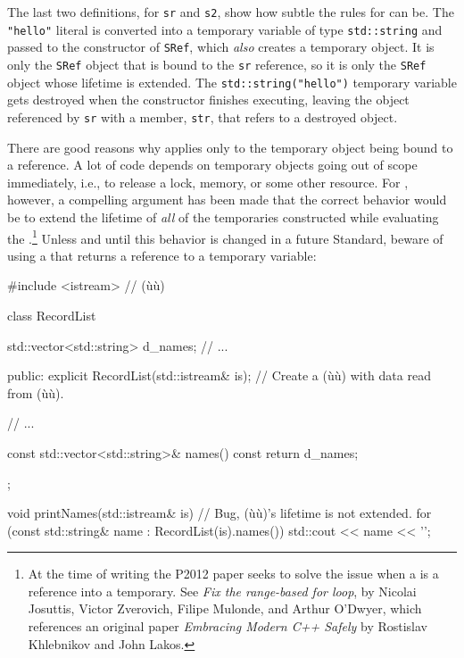{{{The last two definitions, for \lstinline!sr! and \lstinline!s2!, show how
subtle the rules for  can be. The
\lstinline!"hello"! literal is converted into a temporary variable of type
\lstinline!std::string! and passed to the constructor of \lstinline!SRef!,
which \emph{also} creates a temporary object. It is only the
\lstinline!SRef! object that is bound to the \lstinline!sr! reference, so it
is only the \lstinline!SRef! object whose lifetime is extended. The
\lstinline!std::string("hello")! temporary variable gets destroyed when the
constructor finishes executing, leaving the object referenced by
\lstinline!sr! with a member, \lstinline!str!, that refers to a destroyed
object.

There are good reasons why  applies only to
the temporary object being bound to a reference. A lot of code depends
on temporary objects going out of scope immediately, i.e., to release a
lock, memory, or some other resource. For , however, a compelling argument has been made that
the correct behavior would be to extend the lifetime of \emph{all} of
the temporaries constructed while evaluating the .{\cprotect\footnote{At the time of writing the P2012 paper
seeks to solve the issue when a  is a
reference into a temporary. See \emph{Fix the range-based for loop},
by Nicolai Josuttis, Victor Zverovich, Filipe Mulonde, and Arthur
O'Dwyer, which references an original paper
\emph{Embracing Modern C++ Safely} by Rostislav Khlebnikov and John
  Lakos.}} Unless and until this behavior is changed in a future
Standard, beware of using a  that returns a
reference to a temporary variable:

\begin{emcppslisting}
#include <istream>  // (ù{}ù)

class RecordList
{
    std::vector<std::string> d_names;
    // ...

public:
    explicit RecordList(std::istream& is);
        // Create a (ù{}ù) with data read from (ù{}ù).

    // ...

    const std::vector<std::string>& names() const { return d_names; }
};

void printNames(std::istream& is)
{
    // Bug, (ù{}ù)'s lifetime is not extended.
    for (const std::string& name : RecordList(is).names())
    {
        std::cout << name << '\n';
    }
}
\end{emcppslisting}
    

}}}
